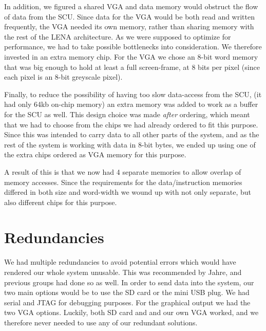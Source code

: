 In addition, we figured a shared \ac{VGA} and data memory would obstruct the
flow of data from the \ac{SCU}. Since data for the \ac{VGA} would be both read
and written frequently, the \ac{VGA} needed its own memory, rather than sharing
memory with the rest of the LENA architecture. As we were supposed to optimize
for performance, we had to take possible bottlenecks into consideration. We
therefore invested in an extra memory chip. For the VGA we chose an 8-bit word
memory that was big enough to hold at least a full screen-frame, at 8 bits per
pixel (since each pixel is an 8-bit greyscale pixel).

Finally, to reduce the possibility of having too slow data-access from the SCU,
(it had only 64kb on-chip memory) an extra memory was added to work as a buffer
for the SCU as well. This design choice was made {\em after} ordering, which
meant that we had to choose from the chips we had already ordered to fit this
purpose. Since this was intended to carry data to all other parts of the system,
and as the rest of the system is working with data in 8-bit bytes, we ended up
using one of the extra chips ordered as \ac{VGA} memory for this purpose.

A result of this is that we now had 4 separate memories to allow overlap of
memory accesses. Since the requirements for the data/instruction memories
differed in both size and word-width we wound up with not only separate, but
also different chips for this purpose.

\section{Redundancies}
We had multiple redundancies to avoid potential errors which would have rendered
our whole system unusable. This was recommended by Jahre, and previous groups
had done so as well. In order to send data into the system, our two main options
would be to use the \ac{SD} card or the mini \ac{USB} plug. We had serial and
\ac{JTAG} for debugging purposes. For the graphical output we had the two
\ac{VGA} options. Luckily, both \ac{SD} card and and our own \ac{VGA} worked,
and we therefore never needed to use any of our redundant solutions.

